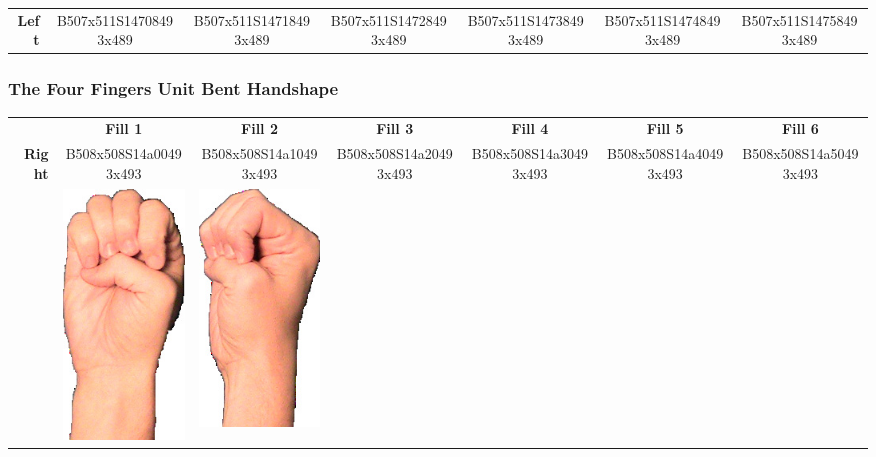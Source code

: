 \documentclass{article}
\begin{document}
\begin{center}
\begin{tabular}{r*{6}{c}}
\textbf{Left}&
B507x511S14708493x489&
B507x511S14718493x489&
B507x511S14728493x489&
B507x511S14738493x489&
B507x511S14748493x489&
B507x511S14758493x489\\
\end{tabular}
\end{center}

\subsubsection{The Four Fingers Unit Bent Handshape}

\begin{center}
\begin{tabular}{r*{6}{c}}
&\textbf{Fill 1}&\textbf{Fill 2}&\textbf{Fill 3}&\textbf{Fill 4}&\textbf{Fill 5}&\textbf{Fill 6}\\
\multirow{2}{*}{\textbf{Right}}&
B508x508S14a00493x493&
B508x508S14a10493x493&
B508x508S14a20493x493&
B508x508S14a30493x493&
B508x508S14a40493x493&
B508x508S14a50493x493\\
&
\includegraphics[scale=0.1]{images/04-04-1.jpg}&
\includegraphics[scale=0.1]{images/04-04-2.jpg}&

\end{tabular}
\end{center}
\end{document}
